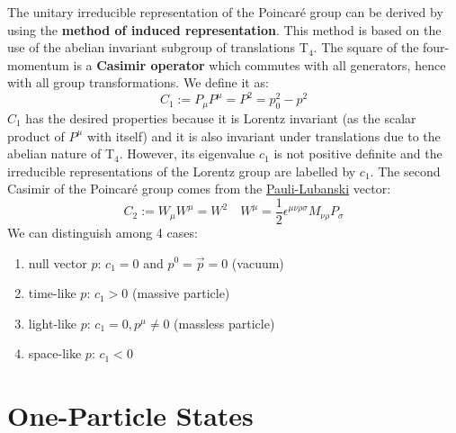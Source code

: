 \documentclass[../main.tex]{subfiles}
\begin{document}
The unitary irreducible representation of the Poincaré group can be derived by using the \textbf{method of induced representation}. This method is based on the use of the abelian invariant subgroup of translations T$_4$. The square of the four-momentum is a \textbf{Casimir operator} which commutes with all generators, hence with all group transformations. We define it as:
\[
C_1:=P_\mu P^\mu=P^2=p_0^2-p^2
\]
$C_1$ has the desired properties because it is Lorentz invariant (as the scalar product of $P^\mu$ with itself) and it is also invariant under translations due to the abelian nature of T$_4$. However, its eigenvalue $c_1$ is not positive definite and the irreducible representations of the Lorentz group are labelled by $c_1$. The second Casimir of the Poincaré group comes from the \href{https://en.wikipedia.org/wiki/Pauli-Lubanski_pseudovector}{Pauli-Lubanski} vector:
\[
C_2:=W_\mu W^\mu=W^2 \quad W^\mu=\frac{1}{2}\epsilon^{\mu\nu\rho\sigma}M_{\nu\rho}P_\sigma
\]
We can distinguish among 4 cases:
\begin{enumerate}
    \item null vector $p$: $c_1=0$ and $p^0=\Vec{p}=0$ (vacuum)
    \item time-like $p$: $c_1>0$ (massive particle)
    \item light-like $p$: $c_1=0, p^\mu\neq0$ (massless particle)
    \item space-like $p$: $c_1<0$
\end{enumerate}
\section{One-Particle States}
\end{document}
